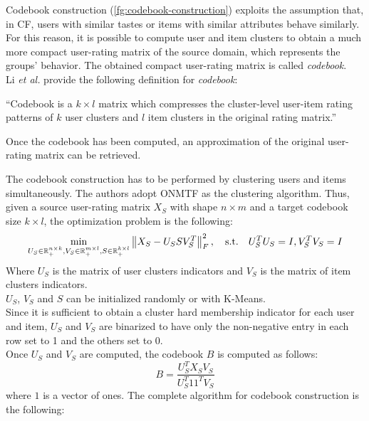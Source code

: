 Codebook construction (\autoref{fg:codebook-construction}) exploits the assumption that, in CF, users with similar tastes or items with similar attributes behave similarly. For this reason, it is possible to compute user and item clusters to obtain a much more compact user-rating matrix of the source domain, which represents the groups' behavior. The obtained compact user-rating matrix is called \textit{codebook}.\\
Li \textit{et al.} provide the following definition for \textit{codebook}:
\begin{displayquote}
\enquote{Codebook is a $k \times l$ matrix which compresses the cluster-level user-item rating patterns of $k$ user clusters and $l$ item clusters in the original rating matrix.}
\end{displayquote}
Once the codebook has been computed, an approximation of the original user-rating matrix can be retrieved.\par
The codebook construction has to be performed by clustering users and items simultaneously. The authors adopt ONMTF \cite{10.1145/1150402.1150420} as the clustering algorithm. Thus, given a source user-rating matrix $X_S$ with shape $n \times m$ and a target codebook size $k \times l$, the optimization problem is the following:
\begin{equation}
\min_{U_S \in \mathbb{R}^{n \times k}_+, V_S \in \mathbb{R}^{m \times l}_+, S \in \mathbb{R}^{k \times l}_+} \left\lVert X_S - U_S S V_S^T\right\rVert_F^2, \quad \text{s.t.} \quad U_S^T U_S = I, V_S^T V_S = I
\end{equation}
Where $U_S$ is the matrix of user clusters indicators and $V_S$ is the matrix of item clusters indicators.\\
$U_S$, $V_S$ and $S$ can be initialized randomly or with K-Means.\\
Since it is sufficient to obtain a cluster hard membership indicator for each user and item, $U_S$ and $V_S$ are binarized to have only the non-negative entry in each row set to 1 and the others set to 0.\\
Once $U_S$ and $V_S$ are computed, the codebook $B$ is computed as follows:
\begin{equation}
\label{eq:codebook-construction}
B = \frac{U_S^T X_S V_S}{U_S^T 1 1^T V_S}
\end{equation}
where $1$ is a vector of ones.
The complete algorithm for codebook construction is the following:
\vskip 0.7cm
